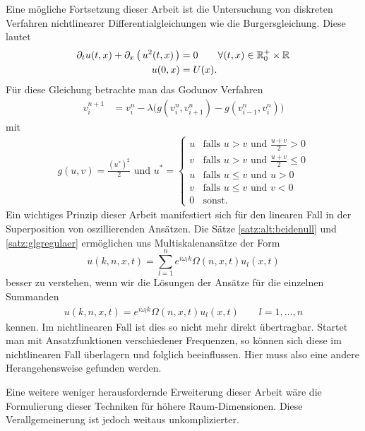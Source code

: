 
Eine mögliche Fortsetzung dieser Arbeit ist die Untersuchung von diskreten Verfahren nichtlinearer  Differentialgleichungen wie die Burgersgleichung.
Diese lautet
\begin{align}
\begin{split}
\partial_t u(t,x) + \partial_x \left( \, u^2(t,x) \,\right) &= 0 \qquad \forall (t,x) \in \mathbb R^+_0 \times \mathbb R\\
u(0,x) &= U(x).
\end{split}
\end{align}
Für diese Gleichung betrachte man das Godunov Verfahren
\begin{align}
v^{n+1}_i &= v^n_i - \lambda \bigl( g(v^n_i, v^n_{i+1}) - g(v^n_{i-1}, v^n_i) \bigr)
\end{align}
mit
\begin{align}
g(u,v) = \frac{\left(u^*\right)^2}2 \text{ und } u^* =
\begin{cases}
u & \text{falls $u > v$ und $\frac {u+v}2 > 0$}\\
v & \text{falls $u > v$ und $\frac {u+v}2 \leq 0$}\\
u & \text{falls $u \leq v$ und $u > 0$}\\
v & \text{falls $u \leq v$ und $v < 0$}\\
0 & \text{sonst.}
\end{cases}
\end{align}
Ein wichtiges Prinzip dieser Arbeit manifestiert sich für den linearen Fall in der Superposition von oszillierenden Ansätzen.
Die Sätze \ref{satz:alt:beidenull} und \ref{satz:glgregulaer} ermöglichen uns Multiskalenansätze der Form
\[ u(k,n,x,t) = \sum_{l=1}^n e^{i \omega_l k} \Omega(n,x,t) u_l(x,t) \]
besser zu verstehen, wenn wir die Lösungen der Ansätze für die einzelnen Summanden
\begin{align}\label{burgers:1}
u(k,n,x,t) = e^{i \omega_l k} \Omega(n,x,t) u_l(x,t) \qquad l = 1, \ldots, n
\end{align}
kennen.
Im nichtlinearen Fall ist dies so nicht mehr direkt übertragbar.
Startet man mit Ansatzfunktionen verschiedener Frequenzen, so können sich diese im nichtlinearen Fall überlagern und folglich beeinflussen.
Hier muss also eine andere Herangehensweise gefunden werden.

Eine weitere weniger herausfordernde Erweiterung dieser Arbeit wäre die Formulierung dieser Techniken für höhere Raum-Dimensionen.
Diese Verallgemeinerung ist jedoch weitaus unkomplizierter.